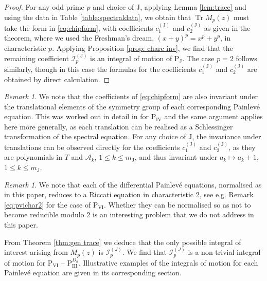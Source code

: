 \documentclass[a4paper,reqno]{amsart}
\numberwithin{equation}{section}
\numberwithin{figure}{section}
\theoremstyle{remark}
\newtheorem{remark}[theorem]{Remark}
\newcommand\Pthree{\textrm{P}_{\textrm{III}}}
\newcommand\Pfour{\textrm{P}_{\textrm{IV}}}
\newcommand\Psix{\textrm{P}_{\textrm{VI}}}
\newcommand\PJ{\textrm{P}_{\textrm{J}}}
\begin{document}
\begin{proof} 
For any odd prime $p$ and choice of $\textrm{J}$,
applying Lemma \ref{lem:trace} and using the data in Table \ref{table:spectraldata}, we obtain that $\operatorname{Tr} M_p(z)$ must take the form in \eqref{eq:chipform}, with coefficients $c_1^{(\textrm{J})}$ and $c_2^{(\textrm{J})}$ as given in the theorem, where we used the Freshman's dream, $(x+y)^p = x^p+y^p$, in characteristic $p$. Applying Proposition \ref{prop: charc inv}, we find that the remaining coefficient $\mathcal{I}_p^{(\textrm{J})}$ is an integral of motion of $\PJ$. The case $p=2$ follows similarly, though in this case the formulas for the coefficients $c_1^{(\textrm{J})}$ and $c_2^{(\textrm{J})}$ are obtained by direct calculation. 
\end{proof}

\begin{remark}\label{rem:invariance_translations}
    We note that the coefficients of \eqref{eq:chipform} are also invariant under the translational elements of the symmetry group of each corresponding Painlev\'e equation. This was worked out in detail in \cite{joshiroffelsen} for $\Pfour$ and the same argument applies here more generally, as each translation can be realised as a Schlessinger transformation of the spectral equation. For any choice of $\textrm{J}$, the invariance under translations can be observed directly for the coefficients $c_1^{(\textrm{J})}$ and $c_2^{(\textrm{J})}$, as they are polynomials in $T$ and $\mathcal{A}_k$, $1\leq k\leq m_\textrm{J}$, and thus invariant under $a_k\mapsto a_k+1$, $1\leq k\leq m_\textrm{J}$.
\end{remark}

\begin{remark}
We note that each of the differential Painlev\'e equations,  normalised as in this paper, reduces to a Riccati equation in characteristic $2$, see e.g. Remark \ref{eq:pvichar2} for the case of $\Psix$. Whether they can be normalised  so as not to become reducible modulo $2$ is an interesting problem that we do not address in this paper.
\end{remark}












 
From Theorem \ref{thm:gen trace} we deduce that the only possible integral of interest arising from $M_p(z)$ is $\mathcal{I}_p^{(J)}$. We find that $\mathcal{I}_p^{(J)}$ is a non-trivial integral of motion for $\Psix$ -- $\Pthree^{D_8}$. Illustrative examples of the integrals of motion for each Painlev\'e equation are given in its corresponding section.
\end{document}
